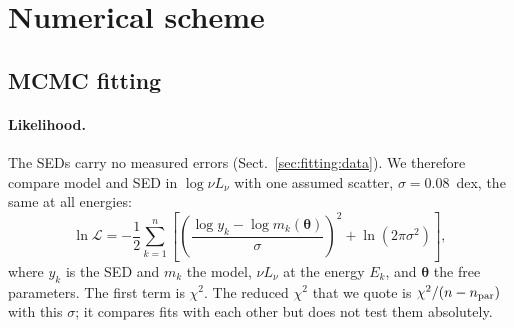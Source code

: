 
\section{Numerical scheme}
\label{app:numerics}


\subsection{MCMC fitting}
\label{app:numerics:mcmc}

\paragraph{Likelihood.}
The SEDs carry no measured errors (Sect.~\ref{sec:fitting:data}).
We therefore compare model and SED in $\log\nu L_\nu$ with one assumed scatter, $\sigma = 0.08$~dex, the same at all energies:
\begin{equation}
\ln\mathcal{L} = -\frac{1}{2}\sum_{k=1}^{n}\left[\left(\frac{\log y_k - \log m_k(\boldsymbol\theta)}{\sigma}\right)^2 + \ln\left(2\pi\sigma^2\right)\right],
\label{eq:loglike}
\end{equation}
where $y_k$ is the SED and $m_k$ the model, $\nu L_\nu$ at the energy $E_k$, and $\boldsymbol\theta$ the free parameters.
The first term is $\chi^2$.
The reduced $\chi^2$ that we quote is $\chi^2/(n - n_{\rm par})$ with this $\sigma$; it compares fits with each other but does not test them absolutely.

